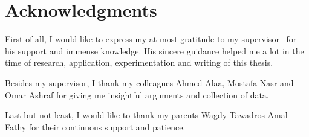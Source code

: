 \chapter*{Acknowledgments}
\label{chap:acknowledgments}
First of all, I would like to express my at-most gratitude to my supervisor \supervisor\ for his support and immense knowledge. His sincere guidance helped me a lot in the time of research, application, experimentation and writing of this thesis.\par
Besides my supervisor, I thank my colleagues Ahmed Alaa, Mostafa Nasr and Omar Ashraf for giving me insightful arguments and collection of data.\par
Last but not least, I would like to thank my parents Wagdy Tawadros Amal Fathy for their continuous support and patience.
\clearpage
